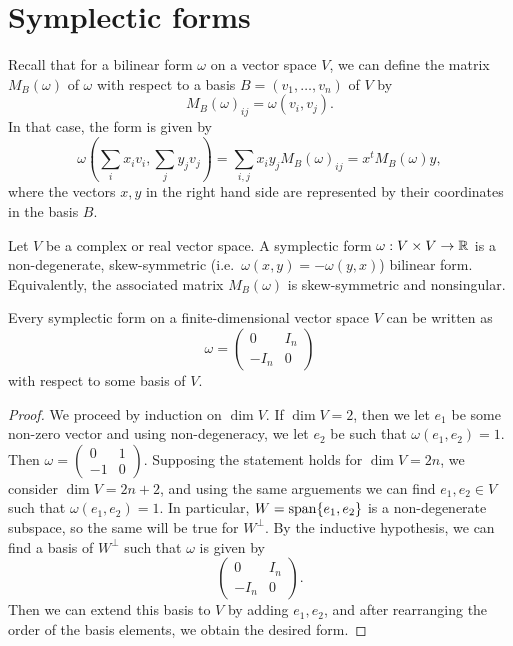 \documentclass{report}
\begin{document}
\section{Symplectic forms}
Recall that for a bilinear form $\omega$ on a vector space $V$, we can define the matrix $M_B(\omega)$ of $\omega$ with respect to a basis $B = (v_1, \ldots, v_n)$ of $V$ by
\[
M_B(\omega)_{ij} = \omega(v_i, v_j).
\]
In that case, the form is given by
\[
\omega\left(\sum_i x_i v_i, \sum_j y_j v_j\right) = \sum_{i,j} x_i y_j M_B(\omega)_{ij} = x^t M_B(\omega) y,
\]
where the vectors $x, y$ in the right hand side are represented by their coordinates in the basis $B$.
\begin{definition}
    Let $V$ be a complex or real vector space.
    A symplectic form $\omega: V \times V \to \mathbb{R}$ is a non-degenerate, skew-symmetric (i.e.\ $\omega(x,y) = - \omega(y,x)$) bilinear form.
    Equivalently, the associated matrix $M_B(\omega)$ is skew-symmetric and nonsingular.
\end{definition}
\begin{proposition}
    Every symplectic form on a finite-dimensional vector space $V$ can be written as 
    \[
    \omega = \begin{pmatrix}
        0 & I_n \\
        -I_n & 0
    \end{pmatrix}
    \]
    with respect to some basis of $V$.
\end{proposition}
\begin{proof}
    We proceed by induction on $\dim V$.
    If $\dim V = 2$, then we let $e_1$ be some non-zero vector and using non-degeneracy, we let $e_2$ be such that $\omega(e_1, e_2) = 1$.
    Then $\omega = \begin{pmatrix} 0 & 1 \\ -1 & 0 \end{pmatrix}$.
    Supposing the statement holds for $\dim V = 2n$, we consider $\dim V = 2n+2$, and using the same arguements we can find $e_1, e_2 \in V$ such that $\omega(e_1, e_2) = 1$.
    In particular, $W = \operatorname{span} \{e_1, e_2\}$ is a non-degenerate subspace, so the same will be true for $W^\perp$.
    By the inductive hypothesis, we can find a basis of $W^\perp$ such that $\omega$ is given by
    \[
    \begin{pmatrix}
        0 & I_n \\
        -I_n & 0
    \end{pmatrix}.
    \]
    Then we can extend this basis to $V$ by adding $e_1, e_2$, and after rearranging the order of the basis elements, we obtain the desired form.
\end{proof}
\end{document}
